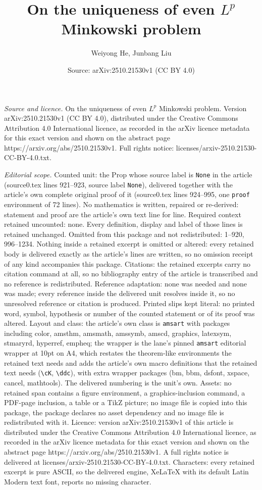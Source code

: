 \documentclass[10pt,a4paper]{amsart}
\title[On the uniqueness of even $L^p$ Minkowski problem]{On the uniqueness of even $L^p$ Minkowski problem}
\author{Weiyong He, Junbang Liu}
\date{Source: arXiv:2510.21530v1 (CC BY 4.0)}
\begin{document}
\maketitle

\noindent\emph{Source and licence.} On the uniqueness of even $L^p$ Minkowski problem. Version arXiv:2510.21530v1 (CC BY 4.0), distributed under the Creative Commons Attribution 4.0 International licence, as recorded in the arXiv licence metadata for this exact version and shown on the abstract page https://arxiv.org/abs/2510.21530v1. Full rights notice: licenses/arxiv-2510.21530-CC-BY-4.0.txt.\par\smallskip

\noindent\textit{Editorial scope.} Counted unit: the Prop whose source label is \texttt{None} in the article (source0.tex lines 921--923, source label \texttt{None}), delivered together with the article's own complete original proof of it (source0.tex lines 924--995, one \texttt{proof} environment of 72 lines). No mathematics is written, repaired or re-derived: statement and proof are the article's own text line for line. Required context retained uncounted: none. Every definition, display and label of those lines is retained unchanged. Omitted from this package and not redistributed: 1--920, 996--1234. Nothing inside a retained excerpt is omitted or altered: every retained body is delivered exactly as the article's lines are written, so no omission receipt of any kind accompanies this package. Citations: the retained excerpts carry no citation command at all, so no bibliography entry of the article is transcribed and no reference is redistributed. Reference adaptation: none was needed and none was made; every reference inside the delivered unit resolves inside it, so no unresolved reference or citation is produced. Printed slips kept literal: no printed word, symbol, hypothesis or number of the counted statement or of its proof was altered. Layout and class: the article's own class is \texttt{amsart} with packages including color, amsthm, amsmath, amssymb, amscd, graphics, latexsym, stmaryrd, hyperref, empheq; the wrapper is the lane's pinned \texttt{amsart} editorial wrapper at 10pt on A4, which restates the theorem-like environments the retained text needs and adds the article's own macro definitions that the retained text needs (\texttt{\textbackslash cK}, \texttt{\textbackslash ddc}), with extra wrapper packages (bm, bbm, dsfont, xspace, cancel, mathtools). The delivered numbering is the unit's own. Assets: no retained span contains a figure environment, a graphics-inclusion command, a PDF-page inclusion, a table or a TikZ picture; no image file is copied into this package, the package declares no asset dependency and no image file is redistributed with it. Licence: version arXiv:2510.21530v1 of this article is distributed under the Creative Commons Attribution 4.0 International licence, as recorded in the arXiv licence metadata for this exact version and shown on the abstract page https://arxiv.org/abs/2510.21530v1. A full rights notice is delivered at licenses/arxiv-2510.21530-CC-BY-4.0.txt. Characters: every retained excerpt is pure ASCII, so the delivered engine, XeLaTeX with its default Latin Modern text font, reports no missing character.
\end{document}
